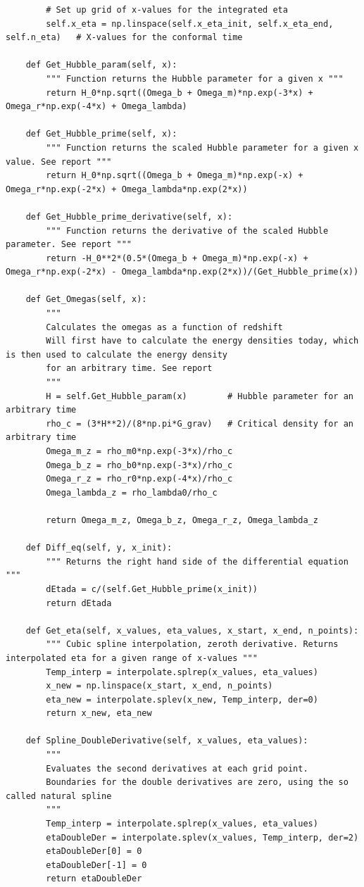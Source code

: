 \documentclass[12pt]{article}
\begin{document}
\begin{lstlisting}
		# Set up grid of x-values for the integrated eta
		self.x_eta = np.linspace(self.x_eta_init, self.x_eta_end, self.n_eta)	# X-values for the conformal time

	def Get_Hubble_param(self, x):
		""" Function returns the Hubble parameter for a given x """
		return H_0*np.sqrt((Omega_b + Omega_m)*np.exp(-3*x) + Omega_r*np.exp(-4*x) + Omega_lambda)

	def Get_Hubble_prime(self, x):
		""" Function returns the scaled Hubble parameter for a given x value. See report """
		return H_0*np.sqrt((Omega_b + Omega_m)*np.exp(-x) + Omega_r*np.exp(-2*x) + Omega_lambda*np.exp(2*x))

	def Get_Hubble_prime_derivative(self, x):
		""" Function returns the derivative of the scaled Hubble parameter. See report """
		return -H_0**2*(0.5*(Omega_b + Omega_m)*np.exp(-x) + Omega_r*np.exp(-2*x) - Omega_lambda*np.exp(2*x))/(Get_Hubble_prime(x))

	def Get_Omegas(self, x):
		""" 
		Calculates the omegas as a function of redshift
		Will first have to calculate the energy densities today, which is then used to calculate the energy density
		for an arbitrary time. See report
		"""
		H = self.Get_Hubble_param(x)		# Hubble parameter for an arbitrary time
		rho_c = (3*H**2)/(8*np.pi*G_grav)	# Critical density for an arbitrary time
		Omega_m_z = rho_m0*np.exp(-3*x)/rho_c
		Omega_b_z = rho_b0*np.exp(-3*x)/rho_c
		Omega_r_z = rho_r0*np.exp(-4*x)/rho_c
		Omega_lambda_z = rho_lambda0/rho_c

		return Omega_m_z, Omega_b_z, Omega_r_z, Omega_lambda_z

	def Diff_eq(self, y, x_init):
		""" Returns the right hand side of the differential equation """
		dEtada = c/(self.Get_Hubble_prime(x_init))
		return dEtada

	def Get_eta(self, x_values, eta_values, x_start, x_end, n_points):
		""" Cubic spline interpolation, zeroth derivative. Returns interpolated eta for a given range of x-values """
		Temp_interp = interpolate.splrep(x_values, eta_values)
		x_new = np.linspace(x_start, x_end, n_points)
		eta_new = interpolate.splev(x_new, Temp_interp, der=0)
		return x_new, eta_new

	def Spline_DoubleDerivative(self, x_values, eta_values):
		""" 
		Evaluates the second derivatives at each grid point.
		Boundaries for the double derivatives are zero, using the so called natural spline 
		"""
		Temp_interp = interpolate.splrep(x_values, eta_values)
		etaDoubleDer = interpolate.splev(x_values, Temp_interp, der=2)
		etaDoubleDer[0] = 0
		etaDoubleDer[-1] = 0
		return etaDoubleDer


\end{lstlisting}
\end{document}
